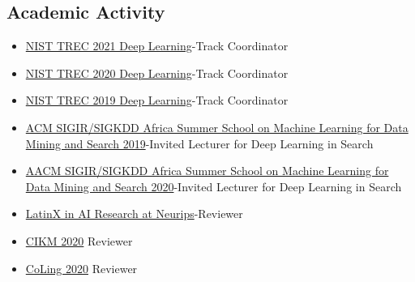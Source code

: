 \documentclass[line,margin]{res}
\begin{document}
\begin{resume}
\subsection{Academic Activity}
\begin{itemize} 
\itemsep -5pt
\item  \href{https://trec.nist.gov/pubs/call2020.html}{NIST TREC 2021 Deep Learning}-Track Coordinator
\item  \href{https://trec.nist.gov/pubs/call2019.html}{NIST TREC 2020 Deep Learning}-Track Coordinator
\item  \href{https://trec.nist.gov/pubs/call2020.html}{NIST TREC 2019 Deep Learning}-Track Coordinator
\item \href{http://sigir.org/afirm2019/}{ACM SIGIR/SIGKDD Africa Summer School on Machine Learning for Data Mining and Search 2019}-Invited Lecturer for Deep Learning in Search
\item \href{http://sigir.org/afirm2020/}{AACM SIGIR/SIGKDD Africa Summer School on Machine Learning for Data Mining and Search 2020}-Invited Lecturer for Deep Learning in Search
\item \href{http://www.latinxinai.org/neurips-2019}{LatinX in AI Research at Neurips}-Reviewer
\item \href{https://www.cikm2020.org/}{CIKM 2020} Reviewer
\item \href{https://coling2020.org/}{CoLing 2020} Reviewer
\end{itemize}

\end{resume}
\end{document}
